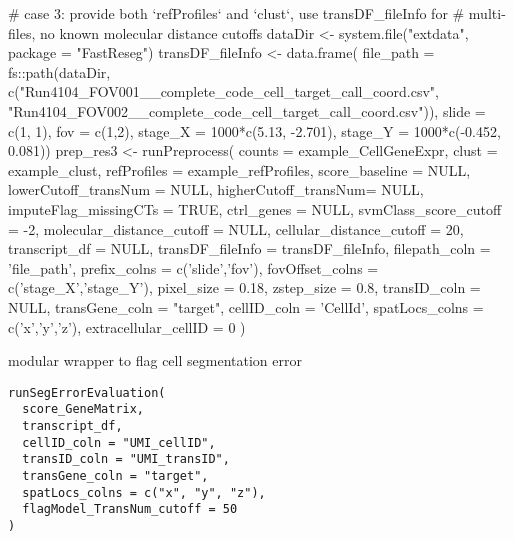 \documentclass[letterpaper]{book}
\begin{document}
\begin{Examples}
\begin{ExampleCode}
# case 3: provide both `refProfiles` and `clust`, use transDF_fileInfo for 
# multi-files, no known molecular distance cutoffs
dataDir <- system.file("extdata", package = "FastReseg")
transDF_fileInfo <- data.frame(
  file_path = fs::path(dataDir,
                       c("Run4104_FOV001__complete_code_cell_target_call_coord.csv",
                         "Run4104_FOV002__complete_code_cell_target_call_coord.csv")),
  slide = c(1, 1),
  fov = c(1,2),
  stage_X = 1000*c(5.13, -2.701),
  stage_Y = 1000*c(-0.452, 0.081))
prep_res3 <- runPreprocess(
  counts = example_CellGeneExpr,
  clust = example_clust,
  refProfiles = example_refProfiles,
  score_baseline = NULL,
  lowerCutoff_transNum = NULL,
  higherCutoff_transNum= NULL,
  imputeFlag_missingCTs = TRUE,
  ctrl_genes = NULL,
  svmClass_score_cutoff = -2,
  molecular_distance_cutoff = NULL,
  cellular_distance_cutoff = 20,
  transcript_df = NULL, 
  transDF_fileInfo = transDF_fileInfo, 
  filepath_coln = 'file_path', 
  prefix_colns = c('slide','fov'), 
  fovOffset_colns = c('stage_X','stage_Y'), 
  pixel_size = 0.18,
  zstep_size = 0.8, 
  transID_coln = NULL,
  transGene_coln = "target",
  cellID_coln = 'CellId',
  spatLocs_colns = c('x','y','z'),
  extracellular_cellID = 0 
)
\end{ExampleCode}
\end{Examples}
%
\begin{Description}
modular wrapper to flag cell segmentation error
\end{Description}
%
\begin{Usage}
\begin{verbatim}
runSegErrorEvaluation(
  score_GeneMatrix,
  transcript_df,
  cellID_coln = "UMI_cellID",
  transID_coln = "UMI_transID",
  transGene_coln = "target",
  spatLocs_colns = c("x", "y", "z"),
  flagModel_TransNum_cutoff = 50
)
\end{verbatim}
\end{Usage}
%
\end{document}
